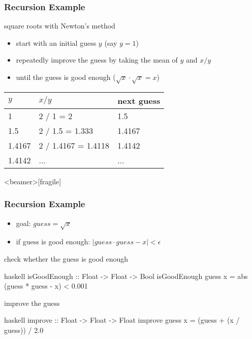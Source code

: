 \documentclass[dvipsnames]{beamer}
\theoremstyle{plain}
\begin{document}
\begin{frame}
  \frametitle{Recursion Example}

  \begin{exampleblock}{square roots with Newton's method}
    \begin{itemize}
      \item start with an initial guess $y$ (say $y = 1$)
      \item repeatedly improve the guess by taking the mean of $y$
        and $x / y$
      \item until the guess is good enough ($\sqrt x \cdot \sqrt x = x$)
    \end{itemize}

    \begin{center}
      \begin{tabular}{lll}
      $y$      & $x / y$             & next guess\\\hline
      1        & 2 / 1 = 2           & 1.5\\
      1.5      & 2 / 1.5 = 1.333     & 1.4167\\
      1.4167   & 2 / 1.4167 = 1.4118 & 1.4142\\
      1.4142   & ...                 & ...
      \end{tabular}
    \end{center}
  \end{exampleblock}
\end{frame}

\begin{frame}<beamer>[fragile]
  \frametitle{Recursion Example}

  \begin{itemize}
    \item goal: $guess = \sqrt x$
    \item if guess is good enough: $|guess \cdot guess - x| < \epsilon$
  \end{itemize}

  \pause
  \begin{exampleblock}{check whether the guess is good enough}
    \begin{pygments}{haskell}
isGoodEnough :: Float -> Float -> Bool
isGoodEnough guess x = abs (guess * guess - x) < 0.001
    \end{pygments}
  \end{exampleblock}

  \pause
  \begin{exampleblock}{improve the guess}
    \begin{pygments}{haskell}
improve :: Float -> Float -> Float
improve guess x = (guess + (x / guess)) / 2.0
    \end{pygments}
  \end{exampleblock}
\end{frame}
\end{document}
